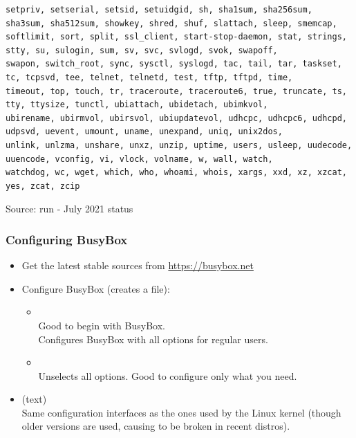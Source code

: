 \begin{frame}[fragile]
\begin{verbatim}
setpriv, setserial, setsid, setuidgid, sh, sha1sum, sha256sum, sha3sum, sha512sum, showkey, shred, shuf, slattach, sleep, smemcap,
softlimit, sort, split, ssl_client, start-stop-daemon, stat, strings, stty, su, sulogin, sum, sv, svc, svlogd, svok, swapoff,
swapon, switch_root, sync, sysctl, syslogd, tac, tail, tar, taskset, tc, tcpsvd, tee, telnet, telnetd, test, tftp, tftpd, time,
timeout, top, touch, tr, traceroute, traceroute6, true, truncate, ts, tty, ttysize, tunctl, ubiattach, ubidetach, ubimkvol,
ubirename, ubirmvol, ubirsvol, ubiupdatevol, udhcpc, udhcpc6, udhcpd, udpsvd, uevent, umount, uname, unexpand, uniq, unix2dos,
unlink, unlzma, unshare, unxz, unzip, uptime, users, usleep, uudecode, uuencode, vconfig, vi, vlock, volname, w, wall, watch,
watchdog, wc, wget, which, who, whoami, whois, xargs, xxd, xz, xzcat, yes, zcat, zcip
  \end{verbatim}
  \vfill
  \footnotesize
  Source: run  - July 2021 status
\end{frame}

\begin{frame}
  \frametitle{Configuring BusyBox}
  \begin{itemize}
  \item Get the latest stable sources from \url{https://busybox.net}
  \item Configure BusyBox (creates a  file):
    \begin{itemize}
    \item {}\\
      Good to begin with BusyBox.\\
      Configures BusyBox with all options for regular users.
    \item {}\\
      Unselects all options. Good to configure only what you need.
    \end{itemize}
  \item {} (text)\\
    Same configuration interfaces as the ones used by the Linux kernel
    (though older versions are used, causing  to
    be broken in recent distros).
  \end{itemize}
\end{frame}

